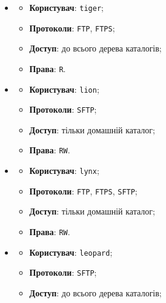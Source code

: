 \documentclass[14pt, a4paper]{extreport}
\begin{document}
	\begin{itemize}
		\item \begin{itemize}
			\item \textbf{Користувач}: \texttt{tiger};
			
			\item \textbf{Протоколи}: \texttt{FTP}, \texttt{FTPS};
			
			\item \textbf{Доступ}: до всього дерева каталогів;
			
			\item \textbf{Права}: \texttt{R}.
		\end{itemize}
		
		\item \begin{itemize}
			\item \textbf{Користувач}: \texttt{lion};
			
			\item \textbf{Протоколи}: \texttt{SFTP};
			
			\item \textbf{Доступ}: тільки домашній каталог;
			
			\item \textbf{Права}: \texttt{RW}.
		\end{itemize}
		
		\pagebreak
		
		\item \begin{itemize}
			\item \textbf{Користувач}: \texttt{lynx};
			
			\item \textbf{Протоколи}: \texttt{FTP}, \texttt{FTPS}, \texttt{SFTP};
			
			\item \textbf{Доступ}: тільки домашній каталог;
			
			\item \textbf{Права}: \texttt{RW}.
		\end{itemize}
		
		\item \begin{itemize}
			\item \textbf{Користувач}: \texttt{leopard};
			
			\item \textbf{Протоколи}: \texttt{SFTP};
			
			\item \textbf{Доступ}: до всього дерева каталогів;
			

\end{itemize}
\end{itemize}
\end{document}
